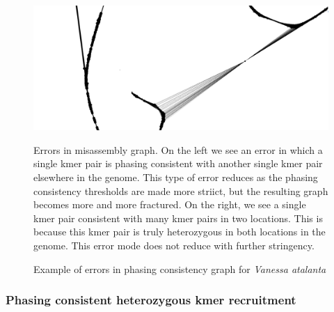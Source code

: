 {\begin{figure}[htbp!]
\caption{Example of errors in phasing consistency graph for \textit{Vanessa atalanta}}
\label{figure:misassemblygraph}
\begin{centering}
\includegraphics[width=\textwidth]{misassemblyphase.png}
\par{Errors in misassembly graph. On the left we see an error in which a single kmer pair is phasing consistent with another single kmer pair elsewhere in the genome. This type of error reduces as the phasing consistency thresholds are made more striict, but the resulting graph becomes more and more fractured. On the right, we see a single kmer pair consistent with many kmer pairs in two locations. This is because this kmer pair is truly heterozygous in both locations in the genome. This error mode does not reduce with further stringency. }
\end{centering}
\end{figure}

\subsubsection{Phasing consistent heterozygous kmer recruitment}

}
